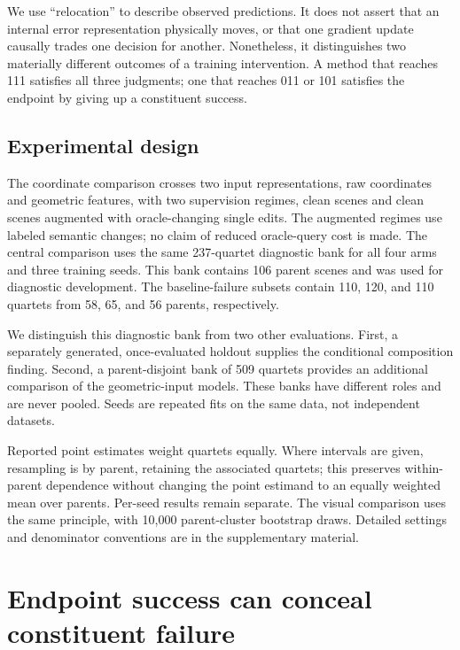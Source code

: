 We use ``relocation'' to describe observed predictions. It does not assert that an internal error representation physically moves, or that one gradient update causally trades one decision for another. Nonetheless, it distinguishes two materially different outcomes of a training intervention. A method that reaches 111 satisfies all three judgments; one that reaches 011 or 101 satisfies the endpoint by giving up a constituent success.

\hypertarget{experimental-design}{%
\subsection{Experimental design}\label{experimental-design}}

The coordinate comparison crosses two input representations, raw coordinates and geometric features, with two supervision regimes, clean scenes and clean scenes augmented with oracle-changing single edits. The augmented regimes use labeled semantic changes; no claim of reduced oracle-query cost is made. The central comparison uses the same 237-quartet diagnostic bank for all four arms and three training seeds. This bank contains 106 parent scenes and was used for diagnostic development. The baseline-failure subsets contain 110, 120, and 110 quartets from 58, 65, and 56 parents, respectively.

We distinguish this diagnostic bank from two other evaluations. First, a separately generated, once-evaluated holdout supplies the conditional composition finding. Second, a parent-disjoint bank of 509 quartets provides an additional comparison of the geometric-input models. These banks have different roles and are never pooled. Seeds are repeated fits on the same data, not independent datasets.

Reported point estimates weight quartets equally. Where intervals are given, resampling is by parent, retaining the associated quartets; this preserves within-parent dependence without changing the point estimand to an equally weighted mean over parents. Per-seed results remain separate. The visual comparison uses the same principle, with 10,000 parent-cluster bootstrap draws. Detailed settings and denominator conventions are in the supplementary material.

\hypertarget{endpoint-success-can-conceal-constituent-failure}{%
\section{Endpoint success can conceal constituent failure}\label{endpoint-success-can-conceal-constituent-failure}}

